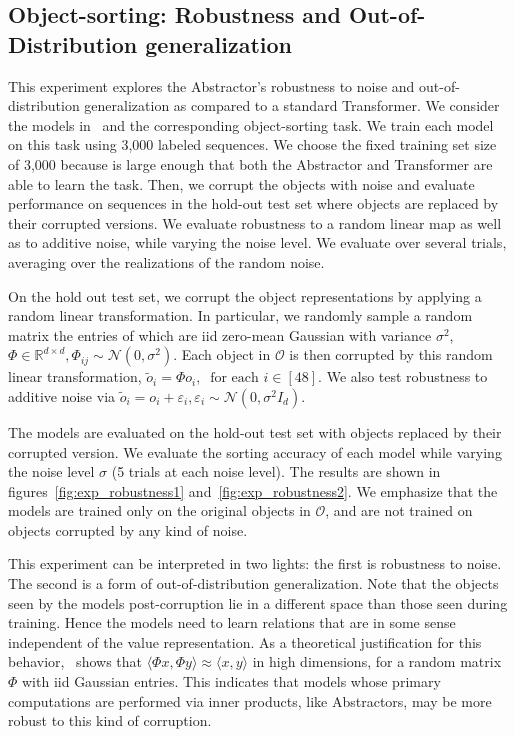\subsection{Object-sorting: Robustness and Out-of-Distribution generalization}

This experiment explores the Abstractor's robustness to noise and out-of-distribution generalization as compared to a standard Transformer. We consider the models in~ and the corresponding object-sorting task. We train each model on this task using 3,000 labeled sequences. We choose the fixed training set size of 3,000 because is large enough that both the Abstractor and Transformer are able to learn the task. Then, we corrupt the objects with noise and evaluate performance on sequences in the hold-out test set where objects are replaced by their corrupted versions. We evaluate robustness to a random linear map as well as to additive noise, while varying the noise level. We evaluate over several trials, averaging over the realizations of the random noise.

On the hold out test set, we corrupt the object representations by applying a random linear transformation. In particular, we randomly sample a random matrix the entries of which are iid zero-mean Gaussian with variance $\sigma^2$, $\Phi \in \mathbb{R}^{d \times d}, \Phi_{ij} \sim \mathcal{N}(0, \sigma^2)$. Each object in $\mathcal{O}$ is then corrupted by this random linear transformation, $\tilde{o}_i = \Phi o_i, \ \text{ for each } i \in [48]$. We also test robustness to additive noise via $\tilde{o}_i = o_i + \varepsilon_i, \varepsilon_i \sim \mathcal{N}(0, \sigma^2 I_d)$.

The models are evaluated on the hold-out test set with objects replaced by their corrupted version. We evaluate the sorting accuracy of each model while varying the noise level $\sigma$ (5 trials at each noise level). The results are shown in figures~\ref{fig:exp_robustness1} and~\ref{fig:exp_robustness2}. We emphasize that the models are trained only on the original objects in $\mathcal{O}$, and are not trained on objects corrupted by any kind of noise.

This experiment can be interpreted in two lights: the first is robustness to noise. The second is a form of out-of-distribution generalization. Note that the objects seen by the models post-corruption lie in a different space than those seen during training. Hence the models need to learn relations that are in some sense independent of the value representation. As a theoretical justification for this behavior,~\cite{zhouCompressedPrivacySensitive2009} shows that $\langle \Phi x, \Phi y \rangle \approx \langle x, y \rangle$ in high dimensions, for a random matrix $\Phi$ with iid Gaussian entries. This indicates that models whose primary computations are performed via inner products, like Abstractors, may be more robust to this kind of corruption.

